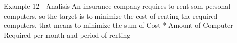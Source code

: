 \begin{frame}{Example 12 - Analisis}
An insurance company requires to rent som personal computers, so the target
is to minimize the cost of renting the required computers, that means to minimize
the sum of Cost * Amount of Computer Required per month and period of renting
\end{frame}
